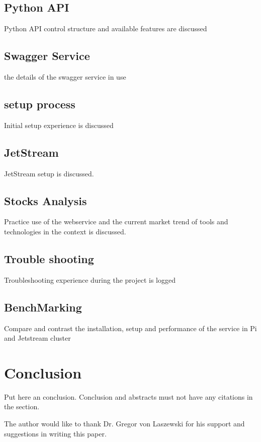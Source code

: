 \subsection{Python API}
Python API control structure and available features are discussed

\subsection{Swagger Service}
the details of the swagger service in use

\subsection{setup process}
Initial setup experience is discussed

\subsection{JetStream}
JetStream setup is discussed.

\subsection{Stocks Analysis}
Practice use of the webservice and the current market trend of tools and technologies in the context is discussed.

\subsection{Trouble shooting}
Troubleshooting experience during the project is logged

\subsection{BenchMarking}
Compare and contrast the installation, setup and performance of the service in Pi and Jetstream cluster


\section{Conclusion}

Put here an conclusion. Conclusion and abstracts must not have any
citations in the section.


\begin{acks}
The author would like to thank Dr. Gregor von Laszewski for his support and 
suggestions in writing this paper.
\end{acks}






